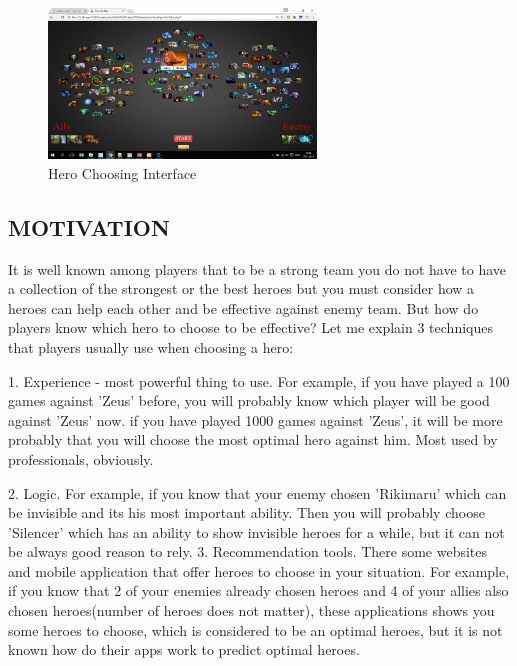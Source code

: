 \documentclass[twocolumn]{autart}    %
\begin{document}
\begin{figure}
\begin{center}
\includegraphics[height=4cm]{herochoosing.png}    %
\caption{Hero Choosing Interface}  %
\label{herochoosing}                                 %
\end{center}                                 %
\end{figure}



\subsection{MOTIVATION} It is well known among players that to be a strong team you do not have to have a collection of the strongest or the best heroes but you must consider how a heroes can help each other and be effective against enemy team. But how do players know which hero to choose to be effective? Let me explain 3  techniques that players usually use when choosing a hero:

1. Experience - most powerful thing to use. For example, if you have played a 100 games against 'Zeus' before, you will probably know which player will be good against 'Zeus' now. if you have played 1000 games against 'Zeus', it will be more probably that you will choose the most optimal hero against him. Most used by professionals, obviously.   

2. Logic. For example, if you know that your enemy chosen 'Rikimaru' which can be invisible and its his most important ability. Then you will probably choose 'Silencer' which has an ability to show invisible heroes for a while, but it can not be always good reason to rely.  
	3. Recommendation tools. There some websites and mobile application that offer heroes to choose in your situation. For example, if you know that 2 of your enemies already chosen heroes and 4 of your allies also chosen heroes(number of heroes does not matter), these applications shows you some heroes to choose, which is considered to be an optimal heroes, but it is not known how do their apps work to predict optimal heroes.
\end{document}
